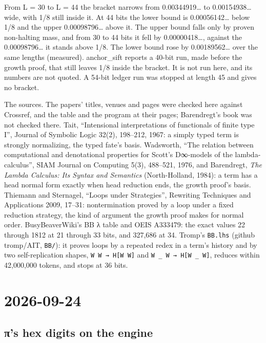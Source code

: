 From L = 30 to L = 44 the bracket narrows from 0.00344919… to 0.00154938… wide, with 1/8 still inside it. At 44 bits the lower bound is 0.00056142… below 1/8 and the upper 0.00098796… above it. The upper bound falls only by proven non-halting mass, and from 30 to 44 bits it fell by 0.00000418…, against the 0.00098796… it stands above 1/8. The lower bound rose by 0.00189562… over the same lengths (measured). anchor\_\allowbreak{}sift reports a 40-bit run, made before the growth proof, that still leaves 1/8 inside the bracket. It is not run here, and its numbers are not quoted. A 54-bit ledger run was stopped at length 45 and gives no bracket.

The sources. The papers' titles, venues and pages were checked here against Crossref, and the table and the program at their pages; Barendregt's book was not checked there. Tait, “Intensional interpretations of functionals of finite type I”, Journal of Symbolic Logic 32(2), 198–212, 1967: a simply typed term is strongly normalizing, the typed fate's basis. Wadsworth, “The relation between computational and denotational properties for Scott's D∞-models of the lambda-calculus”, SIAM Journal on Computing 5(3), 488–521, 1976, and Barendregt, \emph{The Lambda Calculus: Its Syntax and Semantics} (North-Holland, 1984): a term has a head normal form exactly when head reduction ends, the growth proof's basis. Thiemann and Sternagel, “Loops under Strategies”, Rewriting Techniques and Applications 2009, 17–31: nontermination proved by a loop under a fixed reduction strategy, the kind of argument the growth proof makes for normal order. BusyBeaverWiki's BB λ table and OEIS A333479: the exact values 22 through 1812 at 21 through 33 bits, and 327,686 at 34. Tromp's \texttt{BB.\allowbreak{}lhs} (github tromp/AIT, \texttt{BB/\allowbreak{}}): it proves loops by a repeated redex in a term's history and by two self-replication shapes, \texttt{W W → H[W W]} and \texttt{W \_\allowbreak{} W → H[W \_\allowbreak{} W]}, reduces within 42,000,000 tokens, and stops at 36 bits.

\section{\texorpdfstring{2026-09-24}{2026-09-24}}

\subsection{\texorpdfstring{π's hex digits on the engine}{π's hex digits on the engine}}


